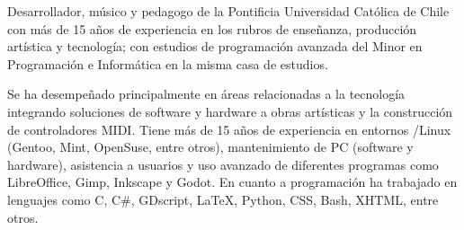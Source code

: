 

\begin{cvparagraph}

Desarrollador, músico y pedagogo de la Pontificia Universidad Católica de Chile
con más de 15 años de experiencia en los rubros de enseñanza, producción
artística y tecnología; con estudios de programación avanzada del Minor en
Programación e Informática en la misma casa de estudios.

Se ha desempeñado principalmente en áreas relacionadas a la tecnología
integrando soluciones de software y hardware a obras artísticas y la
construcción de controladores MIDI. Tiene más de 15 años de experiencia en
entornos /Linux (Gentoo, Mint, OpenSuse, entre otros), mantenimiento
de PC (software y hardware), asistencia a usuarios y uso avanzado de diferentes
programas como LibreOffice, Gimp, Inkscape y Godot. En cuanto a programación ha
trabajado en lenguajes como C, C\#, GDscript, LaTeX, Python, CSS, Bash, XHTML,
entre otros.

\end{cvparagraph}

